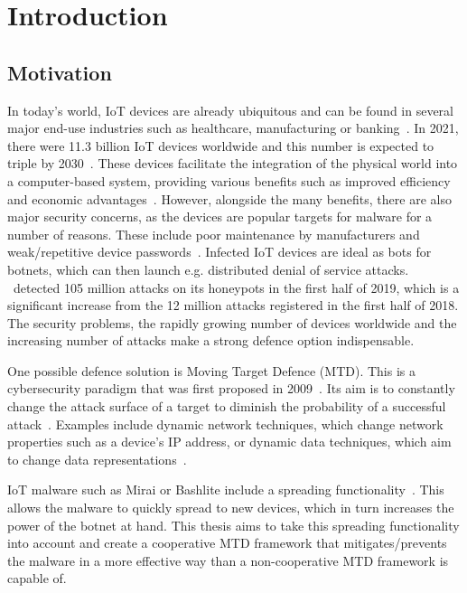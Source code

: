 \chapter{Introduction}



\section{Motivation}
In today's world, IoT devices are already ubiquitous and can be found in several major end-use industries such as healthcare, manufacturing or banking~\cite{website:fortuneIoT}. In 2021, there were 11.3 billion IoT devices worldwide and this number is expected to triple by 2030~\cite{website:statistaIoT}. These devices facilitate the integration of the physical world into a computer-based system, providing various benefits such as improved efficiency and economic advantages~\cite{report:cern}. However, alongside the many benefits, there are also major security concerns, as the devices are popular targets for malware for a number of reasons. These include poor maintenance by manufacturers and weak/repetitive device passwords~\cite{article:DDoSinIoT,website:IBMIoT}. Infected IoT devices are ideal as bots for botnets, which can then launch e.g. distributed denial of service attacks. \cite{website:KasperskyAMalwareStory}~detected 105 million attacks on its honeypots in the first half of 2019, which is a significant increase from the 12 million attacks registered in the first half of 2018. The security problems, the rapidly growing number of devices worldwide and the increasing number of attacks make a strong defence option indispensable.  

One possible defence solution is Moving Target Defence (MTD). This is a cybersecurity paradigm that was first proposed in 2009~\cite{navas:2021MTDWhere}. Its aim is to constantly change the attack surface of a target to diminish the probability of a successful attack~\cite{navas:2021MTDWhere}. Examples include dynamic network techniques, which change network properties such as a device's IP address, or dynamic data techniques, which aim to change data representations~\cite{article:okhraviFindingFocus}. 

IoT malware such as Mirai or Bashlite include a spreading functionality~\cite{article:evOfBashlite}. This allows the malware to quickly spread to new devices, which in turn increases the power of the botnet at hand. This thesis aims to take this spreading functionality into account and create a cooperative MTD framework that mitigates/prevents the malware in a more effective way than a non-cooperative MTD framework is capable of.

